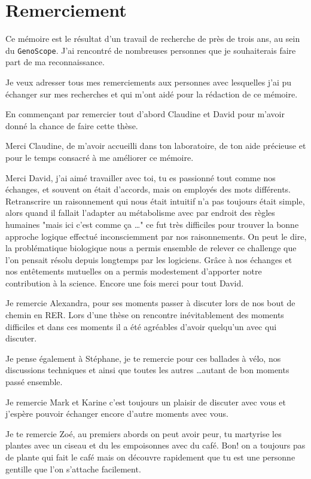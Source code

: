 \chapter*{Remerciement}
    \vspace{-2cm}
    \handwritingFont
    Ce mémoire est le résultat d’un travail de recherche de près de trois ans, au sein du \texttt{GenoScope}. J'ai rencontré de nombreuses personnes que je souhaiterais faire part de ma reconnaissance.
    
    Je veux adresser tous mes remerciements aux personnes avec lesquelles j’ai pu échanger sur mes recherches et qui m’ont aidé pour la rédaction de ce mémoire.
    
    En commençant par remercier tout d’abord Claudine et David pour m'avoir donné la chance de faire cette thèse.
    
    Merci Claudine, de m'avoir accueilli dans ton laboratoire, de ton aide précieuse et pour le temps consacré à me améliorer ce mémoire.
    
    Merci David, j'ai aimé travailler avec toi, tu es passionné tout comme nos échanges, et souvent on était d'accords, mais on employés des mots différents. Retranscrire un raisonnement qui nous était intuitif n'a pas toujours était simple, alors quand il fallait l'adapter au métabolisme avec par endroit des règles humaines "mais ici c'est comme ça \ldots" ce fut très difficiles pour trouver la bonne approche logique effectué inconsciemment par nos raisonnements. On peut le dire, la problématique biologique nous a permis ensemble de relever ce challenge que l'on pensait résolu depuis longtemps par les logiciens. Grâce à nos échanges et nos entêtements mutuelles on a permis modestement d'apporter notre contribution à la science.
    Encore une fois merci pour tout David.
    
    Je remercie Alexandra, pour ses moments passer à discuter lors de nos bout de chemin en RER. Lors d'une thèse on rencontre inévitablement des moments difficiles et dans ces moments il a été agréables d'avoir quelqu'un avec qui discuter.
    
    Je pense également à Stéphane, je te remercie pour ces ballades à vélo, nos discussions techniques et ainsi que toutes les autres \ldots autant de bon moments passé ensemble.
    
    Je remercie Mark et Karine c'est toujours un plaisir de discuter avec vous et j'espère pouvoir échanger encore d'autre moments avec vous.
    
    Je te remercie Zoé, au premiers abords on peut avoir peur, tu martyrise les plantes avec un ciseau et du les empoisonnes avec du café. Bon! on a toujours pas de plante qui fait le café mais on découvre rapidement que tu est une personne gentille que l'on s'attache facilement.
    
